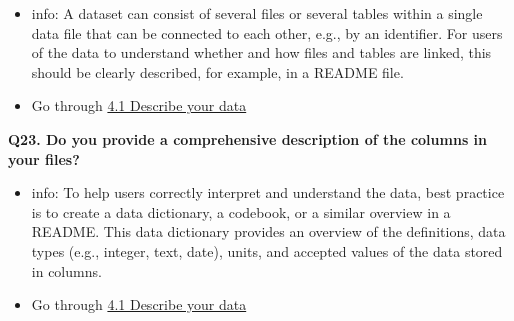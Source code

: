 \documentclass[
  oneside]{book}
\providecommand{\tightlist}{%
  \setlength{\itemsep}{0pt}\setlength{\parskip}{0pt}}
\begin{document}
\begin{itemize}
\tightlist
\item
  info: A dataset can consist of several files or several tables within a single data file that can be connected to each other, e.g., by an identifier. For users of the data to understand whether and how files and tables are linked, this should be clearly described, for example, in a README file.
\item
  Go through \hyperref[describe-data]{4.1 Describe your data}
\end{itemize}

\textbf{Q23. Do you provide a comprehensive description of the columns in your files?}

\begin{itemize}
\tightlist
\item
  info: To help users correctly interpret and understand the data, best practice is to create a data dictionary, a codebook, or a similar overview in a README. This data dictionary provides an overview of the definitions, data types (e.g., integer, text, date), units, and accepted values of the data stored in columns.
\item
  Go through \hyperref[describe-data]{4.1 Describe your data}
\end{itemize}

\printbibliography
\end{document}
